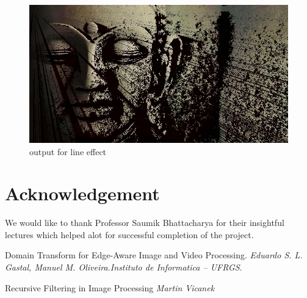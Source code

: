\documentclass[conference]{IEEEtran}
\begin{document}
  \begin{figure}[h]
 	\includegraphics[width = \linewidth]{buddha_out_lines.jpg}
 	\caption{output for line effect}
 	\label{fig:outputLines}
 \end{figure} 


\section{Acknowledgement}
We would like to thank Professor Saumik Bhattacharya for their insightful lectures which helped alot for successful completion of the project. 

\begin{thebibliography}{9}
Domain Transform for Edge-Aware Image and Video Processing.
\textit{Eduardo S. L. Gastal, Manuel M. Oliveira.Instituto de Informatica – UFRGS}. 
 
Recursive Filtering in Image Processing 
\textit{Martin Vicanek}
 
\end{thebibliography}
\end{document}
